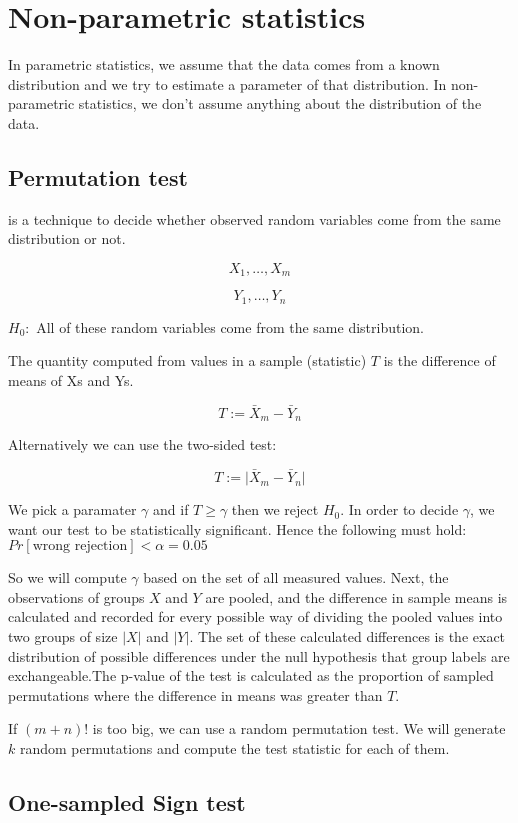 \chapter{Non-parametric statistics}

In parametric statistics, we assume that the data comes from a known distribution and we try to estimate a parameter of that distribution. In non-parametric statistics, we don't assume anything about the distribution of the data.

\section{Permutation test}

is a technique to decide whether observed random variables come from the same distribution or not.

$$
X_1, \dots, X_m
$$

$$
Y_1, \dots, Y_n
$$

$H_0:$ All of these random variables come from the same distribution.

The quantity computed from values in a sample (statistic) $T$ is the difference of means of Xs and Ys.

$$
T := \bar{X}_m - \bar{Y}_n
$$

Alternatively we can use the two-sided test:

$$
T := \vert \bar{X}_m - \bar{Y}_n \vert
$$

We pick a paramater $\gamma$ and if $T \geq \gamma$ then we reject $H_0$. In order to decide $\gamma$, we want our test to be statistically significant. Hence the following must hold: $Pr[\text{wrong rejection} ] < \alpha = 0.05$

So we will compute $\gamma$ based on the set of all measured values. Next, the observations of groups $X$ and $Y$ are pooled, and the difference in sample means is calculated and recorded for every possible way of dividing the pooled values into two groups of size $\vert X \vert$ and $\vert Y \vert$. The set of these calculated differences is the exact distribution of possible differences under the null hypothesis that group labels are exchangeable.The p-value of the test is calculated as the proportion of sampled permutations where the difference in means was greater than $T$.

If $(m+n)!$ is too big, we can use a random permutation test. We will generate $k$ random permutations and compute the test statistic for each of them.

\section{One-sampled Sign test}

